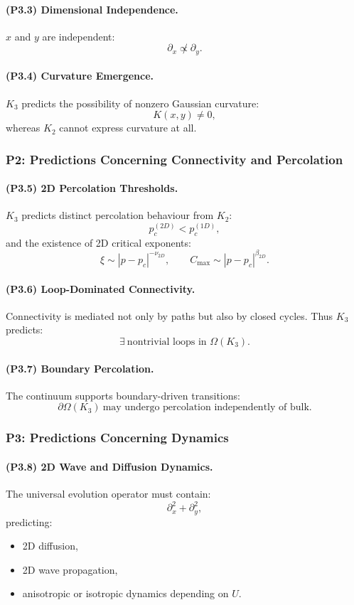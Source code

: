 \paragraph{(P3.3) Dimensional Independence.}
$x$ and $y$ are independent:
\[
\partial_x \not\propto \partial_y.
\]

\paragraph{(P3.4) Curvature Emergence.}
$K_3$ predicts the possibility of nonzero Gaussian curvature:
\[
K(x,y) \neq 0,
\]
whereas $K_2$ cannot express curvature at all.

\subsubsection{P2: Predictions Concerning Connectivity and Percolation}

\paragraph{(P3.5) 2D Percolation Thresholds.}
$K_3$ predicts distinct percolation behaviour from $K_2$:
\[
p_c^{(2D)} < p_c^{(1D)},
\]
and the existence of 2D critical exponents:
\[
\xi \sim |p - p_c|^{-\nu_{2D}},
\qquad
C_{\max} \sim |p - p_c|^{\beta_{2D}}.
\]

\paragraph{(P3.6) Loop-Dominated Connectivity.}
Connectivity is mediated not only by paths but also by closed cycles.  
Thus $K_3$ predicts:
\[
\exists \ \text{nontrivial loops in } \Omega(K_3).
\]

\paragraph{(P3.7) Boundary Percolation.}
The continuum supports boundary-driven transitions:
\[
\partial\Omega(K_3) \ \text{may undergo percolation independently of bulk}.
\]

\subsubsection{P3: Predictions Concerning Dynamics}

\paragraph{(P3.8) 2D Wave and Diffusion Dynamics.}
The universal evolution operator must contain:
\[
\partial_x^2 + \partial_y^2,
\]
predicting:
\begin{itemize}
    \item 2D diffusion,
    \item 2D wave propagation,
    \item anisotropic or isotropic dynamics depending on $U$.
\end{itemize}


